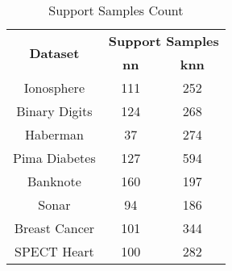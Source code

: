 \begin{table}[htbp]
\caption{Support Samples Count}
\begin{center}
\begin{tabular}{|c|c|c|}
\hline
\multirow{2}{*}{\textbf{Dataset}} & \multicolumn{2}{c|}{\textbf{Support Samples}} \\ \cline{2-3}
 & \textbf{nn} & \textbf{knn} \\ \hline
Ionosphere & 111 & 252 \\ \hline
Binary Digits & 124 & 268 \\ \hline
Haberman & 37 & 274 \\ \hline
Pima Diabetes & 127 & 594 \\ \hline
Banknote & 160 & 197 \\ \hline
Sonar & 94 & 186 \\ \hline
Breast Cancer & 101 & 344 \\ \hline
SPECT Heart & 100 & 282 \\ \hline
\end{tabular}
\label{tab:support}
\end{center}
\end{table}